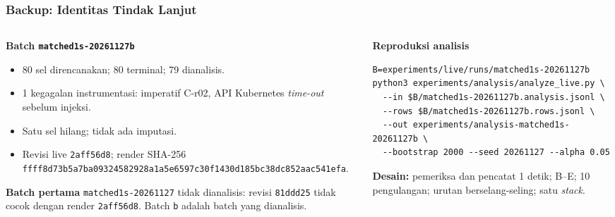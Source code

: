 {
\usebackgroundtemplate{\backgroundcontent}
\begin{frame}[fragile]
    \frametitle{Backup: Identitas Tindak Lanjut}
    \begin{columns}[T]
        \begin{column}{0.47\textwidth}
            \tiny
            \textbf{Batch \texttt{matched1s-20261127b}}
            \begin{itemize}\tiny\setlength{\itemsep}{1pt}
                \item 80 sel direncanakan; 80 terminal; 79 dianalisis.
                \item 1 kegagalan instrumentasi: imperatif C-r02, API Kubernetes \textit{time-out} sebelum injeksi.
                \item Satu sel hilang; tidak ada imputasi.
                \item Revisi live \texttt{2aff56d8}; render SHA-256 \texttt{ffff8d73b5a7ba09324582928a1a5e6597c30}\allowbreak\texttt{f1430d185bc38dc852aac541efa}.
            \end{itemize}
            \vspace{0.04cm}
            \textbf{Batch pertama} \texttt{matched1s-20261127} tidak dianalisis: revisi \texttt{81ddd25} tidak cocok dengan render \texttt{2aff56d8}. Batch \texttt{b} adalah batch yang dianalisis.
        \end{column}
        \begin{column}{0.49\textwidth}
            \tiny
            \textbf{Reproduksi analisis}
            \begin{lstlisting}
B=experiments/live/runs/matched1s-20261127b
python3 experiments/analysis/analyze_live.py \
  --in $B/matched1s-20261127b.analysis.jsonl \
  --rows $B/matched1s-20261127b.rows.jsonl \
  --out experiments/analysis-matched1s-20261127b \
  --bootstrap 2000 --seed 20261127 --alpha 0.05
            \end{lstlisting}
            \textbf{Desain:} pemeriksa dan pencatat 1 detik; B--E; 10 pengulangan; urutan berselang-seling; satu \textit{stack}.
        \end{column}
    \end{columns}
    \vspace{0.02cm}
\end{frame}
}

